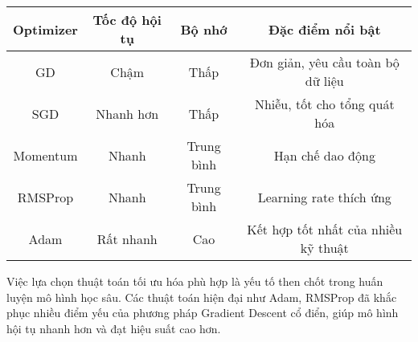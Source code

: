 \begin{center}
\begin{tabular}{|c|c|c|c|}
\hline
\textbf{Optimizer} & \textbf{Tốc độ hội tụ} & \textbf{Bộ nhớ} & \textbf{Đặc điểm nổi bật} \\
\hline
GD & Chậm & Thấp & Đơn giản, yêu cầu toàn bộ dữ liệu \\
SGD & Nhanh hơn & Thấp & Nhiễu, tốt cho tổng quát hóa \\
Momentum & Nhanh & Trung bình & Hạn chế dao động \\
RMSProp & Nhanh & Trung bình & Learning rate thích ứng \\
Adam & Rất nhanh & Cao & Kết hợp tốt nhất của nhiều kỹ thuật \\
\hline
\end{tabular}
\end{center}

Việc lựa chọn thuật toán tối ưu hóa phù hợp là yếu tố then chốt trong huấn luyện mô hình học sâu. Các thuật toán hiện đại như Adam, RMSProp đã khắc phục nhiều điểm yếu của phương pháp Gradient Descent cổ điển, giúp mô hình hội tụ nhanh hơn và đạt hiệu suất cao hơn.
